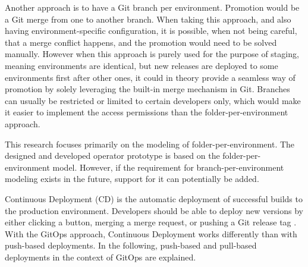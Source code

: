 Another approach is to have a Git branch per environment.
Promotion would be a Git merge from one to another branch.
When taking this approach, and also having environment-specific configuration,
it is possible, when not being careful, that a merge conflict happens,
and the promotion would need to be solved manually.
However when this approach is purely used for the purpose of staging,
meaning environments are identical, but new releases are deployed to some environments first
after other ones,
it could in theory provide a seamless way of promotion by solely leveraging the built-in merge mechanism in Git.
Branches can usually be restricted or limited to certain developers only,
which would make it easier to implement the access permissions than the folder-per-environment approach.

This research focuses primarily on the modeling of folder-per-environment.
The designed and developed operator prototype is based on the folder-per-environment model.
However, if the requirement for branch-per-environment modeling exists in the future,
support for it can potentially be added.






\label{theoretical-background:gitops-cd}

Continuous Deployment (CD) is the automatic deployment of successful builds to the production environment.
Developers should be able to deploy new versions by either clicking a button, merging a merge request, or pushing a Git release tag
\autocite{cloudNativeDevopsMitKubernetesArundel2019cloud}.
With the GitOps approach,
Continuous Deployment works differently than with push-based deployments.
In the following,
push-based and pull-based deployments in the context of GitOps are explained.

